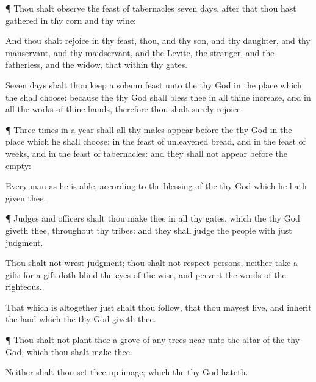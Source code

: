 {\par }{\PP {}¶ Thou shalt
observe the
feast of
tabernacles
seven
days, after that thou hast
gathered in thy
corn and thy
wine:

And thou shalt
rejoice in thy
feast, thou, and thy
son, and thy
daughter, and thy
manservant, and thy
maidservant, and the
Levite, the
stranger, and the
fatherless, and the
widow, that
{} within thy
gates.

Seven
days shalt thou keep a solemn
feast unto the
{} thy
God in the
place which the
{} shall
choose: because the
{} thy
God shall
bless thee in all thine
increase, and in all the
works of thine
hands, therefore thou shalt surely
rejoice.


\par }{\PP {}¶
Three
times in a
year shall all thy
males
appear
before the
{} thy
God in the
place which he shall
choose; in the
feast of unleavened
bread, and in the
feast of
weeks, and in the
feast of
tabernacles: and they shall not
appear
before the
{}
empty:

Every
man
{} as he is
able, according to the
blessing of the
{} thy
God which he hath
given thee.


\par }{\PP {}¶
Judges and
officers shalt thou
make thee in all thy
gates, which the
{} thy
God
giveth thee, throughout thy
tribes: and they shall
judge the
people with
just
judgment.

Thou shalt not
wrest
judgment; thou shalt not
respect
persons, neither
take a
gift: for a
gift doth
blind the
eyes of the
wise, and
pervert the
words of the
righteous.

That which is
altogether
just shalt thou
follow, that thou mayest
live, and
inherit the
land which the
{} thy
God
giveth thee.


\par }{\PP {}¶ Thou shalt not
plant thee a
grove of any
trees near
unto the
altar of the
{} thy
God, which thou shalt
make thee.

Neither shalt thou set thee
up
{}
image; which the
{} thy
God
hateth.




}

